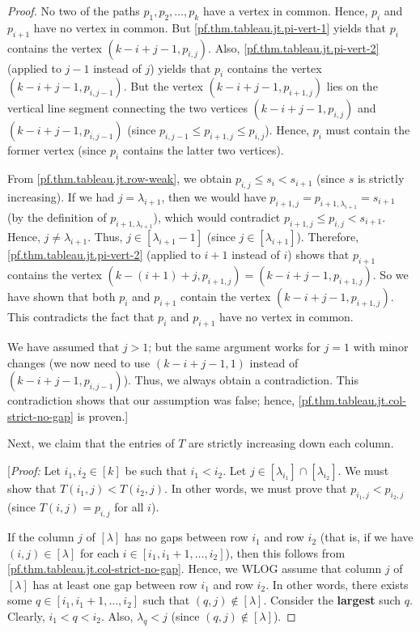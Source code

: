 \documentclass[reqno]{amsart}
\newcommand{\0}{\phantom{c}}
\theoremstyle{plain}
\theoremstyle{definition}
\numberwithin{equation}{section}
\begin{document}
\begin{proof}
No two of the paths $p_{1},p_{2},\ldots,p_{k}$ have a vertex in common. Hence,
$p_{i}$ and $p_{i+1}$ have no vertex in common. But
\eqref{pf.thm.tableau.jt.pi-vert-1} yields that $p_{i}$ contains the vertex
$\left(  k-i+j-1,p_{i,j}\right)  $. Also, \eqref{pf.thm.tableau.jt.pi-vert-2}
(applied to $j-1$ instead of $j$) yields that $p_{i}$ contains the vertex
$\left(  k-i+j-1,p_{i,j-1}\right)  $. But the vertex $\left(
k-i+j-1,p_{i+1,j}\right)  $ lies on the vertical line segment connecting the
two vertices $\left(  k-i+j-1,p_{i,j}\right)  $ and $\left(  k-i+j-1,p_{i,j-1}%
\right)  $ (since $p_{i,j-1}\leq p_{i+1,j}\leq p_{i,j}$). Hence, $p_{i}$ must
contain the former vertex (since $p_{i}$ contains the latter two vertices).

From \eqref{pf.thm.tableau.jt.row-weak}, we obtain $p_{i,j}\leq s_{i}<s_{i+1}$
(since $s$ is strictly increasing). If we had $j=\lambda_{i+1}$, then we would
have $p_{i+1,j}=p_{i+1,\lambda_{i+1}}=s_{i+1}$ (by the definition of
$p_{i+1,\lambda_{i+1}}$), which would contradict $p_{i+1,j}\leq p_{i,j}%
<s_{i+1}$. Hence, $j\neq\lambda_{i+1}$. Thus, $j\in\left[  \lambda
_{i+1}-1\right]  $ (since $j\in\left[  \lambda_{i+1}\right]  $). Therefore,
\eqref{pf.thm.tableau.jt.pi-vert-2} (applied to $i+1$ instead of $i$) shows
that $p_{i+1}$ contains the vertex $\left(  k-\left(  i+1\right)
+j,p_{i+1,j}\right)  =\left(  k-i+j-1,p_{i+1,j}\right)  $. So we have shown
that both $p_{i}$ and $p_{i+1}$ contain the vertex $\left(  k-i+j-1,p_{i+1,j}%
\right)  $. This contradicts the fact that $p_{i}$ and $p_{i+1}$ have no
vertex in common.

We have assumed that $j>1$; but the same argument works for $j=1$ with minor
changes (we now need to use $\left(  k-i+j-1,1\right)  $ instead of $\left(
k-i+j-1,p_{i,j-1}\right)  $). Thus, we always obtain a contradiction. This
contradiction shows that our assumption was false; hence,
\eqref{pf.thm.tableau.jt.col-strict-no-gap} is proven.]

Next, we claim that the entries of $T$ are strictly increasing down each column.

[\textit{Proof:} Let $i_{1},i_{2}\in\left[  k\right]  $ be such that
$i_{1}<i_{2}$. Let $j\in\left[  \lambda_{i_{1}}\right]  \cap\left[
\lambda_{i_{2}}\right]  $. We must show that $T\left(  i_{1},j\right)
<T\left(  i_{2},j\right)  $. In other words, we must prove that $p_{i_{1}%
,j}<p_{i_{2},j}$ (since $T\left(  i,j\right)  =p_{i,j}$ for all $i$).

If the column $j$ of $\left[  \lambda\right]  $ has no gaps between row
$i_{1}$ and row $i_{2}$ (that is, if we have $\left(  i,j\right)  \in\left[
\lambda\right]  $ for each $i\in\left[  i_{1},i_{1}+1,\ldots,i_{2}\right]  $),
then this follows from \eqref{pf.thm.tableau.jt.col-strict-no-gap}. Hence, we
WLOG assume that column $j$ of $\left[  \lambda\right]  $ has at least one gap
between row $i_{1}$ and row $i_{2}$. In other words, there exists some
$q\in\left[  i_{1},i_{1}+1,\ldots,i_{2}\right]  $ such that $\left(
q,j\right)  \notin\left[  \lambda\right]  $. Consider the \textbf{largest}
such $q$. Clearly, $i_{1}<q<i_{2}$. Also, $\lambda_{q}<j$ (since $\left(
q,j\right)  \notin\left[  \lambda\right]  $).


\end{proof}
\end{document}
